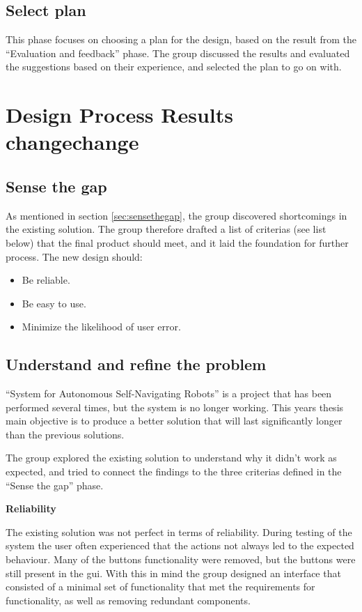 \subsection{Select plan}
\label{sec:selectplan}
This phase focuses on choosing a plan for the design, based on the result from the ``Evaluation and feedback'' phase. The group discussed the results and evaluated the suggestions based on their experience, and selected the plan to go on with.


\section{Design Process Results changechange}
\subsection{Sense the gap}
As mentioned in section \ref{sec:sensethegap}, the group discovered shortcomings in the existing solution. The group therefore drafted a list of criterias (see list below) that the final product should meet, and it laid the foundation for further process. The new design should:

\begin{itemize}
    \item Be reliable.
    \item Be easy to use.
    \item Minimize the likelihood of user error.
\end{itemize}


\subsection{Understand and refine the problem}
``System for Autonomous Self-Navigating Robots'' is a project that has been performed several times, but the system is no longer working. This years thesis main objective is to produce a better solution that will last significantly longer than the previous solutions.

The group explored the existing solution to understand why it didn't work as expected, and tried to connect the findings to the three criterias defined in the ``Sense the gap'' phase.

\textbf{Reliability}

The existing solution was not perfect in terms of reliability. During testing of the system the user often experienced that the actions not always led to the expected behaviour. Many of the buttons functionality were removed, but the buttons were still present in the \acrshort{gui}. With this in mind the group designed an interface that consisted of a minimal set of functionality that met the requirements for functionality, as well as removing redundant components.

